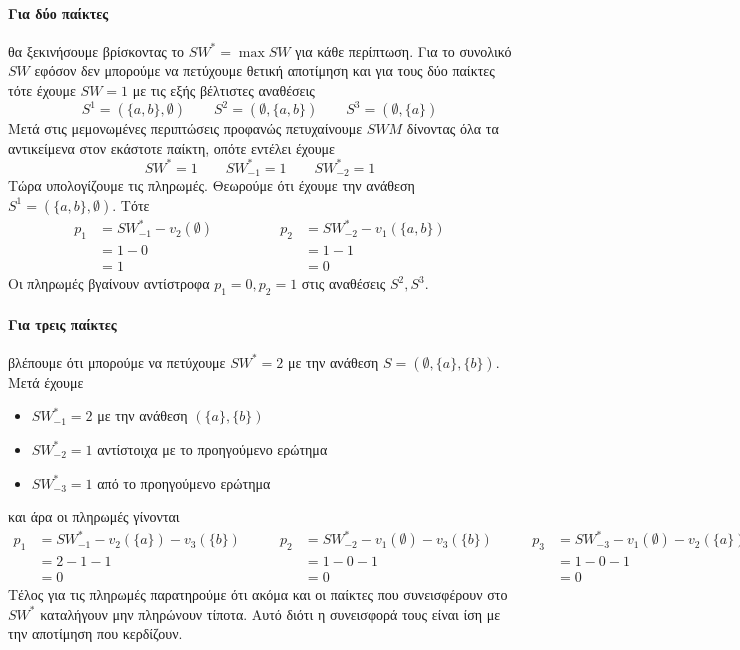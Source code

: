 \documentclass[a4paper,11pt]{article}
\begin{document}
\paragraph{Για δύο παίκτες} θα ξεκινήσουμε βρίσκοντας το $SW^*=\max SW$ για κάθε περίπτωση.
Για το συνολικό $SW$ εφόσον δεν μπορούμε να πετύχουμε θετική αποτίμηση και για τους δύο παίκτες τότε έχουμε $SW=1$ με τις εξής βέλτιστες αναθέσεις
\[
	S^1=(\{a,b\},\emptyset) \qquad S^2=(\emptyset,\{a,b\}) \qquad S^3=(\emptyset,\{a\})
\]
Μετά στις μεμονωμένες περιπτώσεις προφανώς πετυχαίνουμε $SWM$ δίνοντας όλα τα αντικείμενα στον εκάστοτε παίκτη, οπότε εντέλει έχουμε
\[
	SW^* = 1 \qquad SW^*_{-1} = 1 \qquad SW^*_{-2} = 1
\]
Τώρα υπολογίζουμε τις πληρωμές.
Θεωρούμε ότι έχουμε την ανάθεση $S^1=(\{a,b\},\emptyset)$.
Τότε
\[
	\begin{aligned}
		p_1 &= SW^*_{-1} - v_2(\emptyset)\\
			&= 1-0\\
			&= 1
	\end{aligned}
	\qquad\qquad
	\begin{aligned}
		p_2 &= SW^*_{-2} - v_1(\{a,b\})\\
			&= 1-1\\
			&= 0
	\end{aligned}
\]
Οι πληρωμές βγαίνουν αντίστροφα $p_1=0,p_2=1$ στις αναθέσεις $S^2,S^3$.

\paragraph{Για τρεις παίκτες} βλέπουμε ότι μπορούμε να πετύχουμε $SW^*=2$ με την ανάθεση $S=(\emptyset,\{a\},\{b\})$.
Μετά έχουμε
\begin{itemize}
	\item $SW^*_{-1} = 2$ με την ανάθεση $(\{a\},\{b\})$
	\item $SW^*_{-2} = 1$ αντίστοιχα με το προηγούμενο ερώτημα
	\item $SW^*_{-3} = 1$ από το προηγούμενο ερώτημα
\end{itemize}
και άρα οι πληρωμές γίνονται
\[
	\begin{aligned}
		p_1 &= SW^*_{-1} - v_2(\{a\}) - v_3(\{b\})\\
			&= 2-1-1\\
			&= 0
	\end{aligned}
	\qquad
	\begin{aligned}
		p_2 &= SW^*_{-2} - v_1(\emptyset) - v_3(\{b\})\\
			&= 1-0-1\\
			&= 0
	\end{aligned}
	\qquad
	\begin{aligned}
		p_3 &= SW^*_{-3} - v_1(\emptyset) - v_2(\{a\})\\
			&= 1-0-1\\
			&= 0
	\end{aligned}
\]
Τέλος για τις πληρωμές παρατηρούμε ότι ακόμα και οι παίκτες που συνεισφέρουν στο $SW^*$ καταλήγουν μην πληρώνουν τίποτα.
Αυτό διότι η συνεισφορά τους είναι ίση με την αποτίμηση που κερδίζουν.
\end{document}
